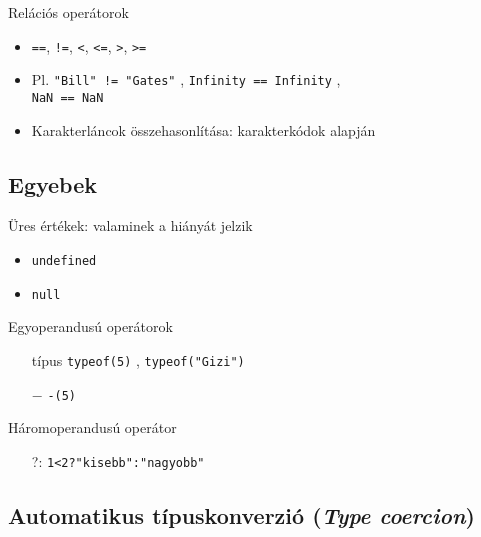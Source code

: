 \documentclass[usenames,dvipsnames,aspectratio=169]{beamer}
\begin{document}
\begin{frame}
    Relációs operátorok
    \begin{itemize}
        \item \texttt{==}, \texttt{!=}, \texttt{<}, \texttt{<=}, \texttt{>}, \texttt{>=} 
        \item Pl. \texttt{"Bill" != "Gates"} , \texttt{Infinity == Infinity} , \\  \texttt{NaN == NaN} 
        \item Karakterláncok összehasonlítása: karakterkódok alapján
    \end{itemize}
\end{frame}

\subsection{Egyebek}

\begin{frame}
    Üres értékek: valaminek a hiányát jelzik
    \begin{itemize}
        \item \texttt{undefined}
        \item \texttt{null}
    \end{itemize}
    \vfill
    Egyoperandusú operátorok
    \begin{itemize}
        \item[típus] \texttt{typeof(5)} , \texttt{typeof("Gizi")} 
        \item[$-$] \texttt{-(5)} 
    \end{itemize}
    \vfill
    Háromoperandusú operátor
    \begin{itemize}
        \item[?:] \texttt{1<2?"kisebb":"nagyobb"} 
    \end{itemize}
\end{frame}

\subsection{Automatikus típuskonverzió (\emph{Type coercion})}
\end{document}
